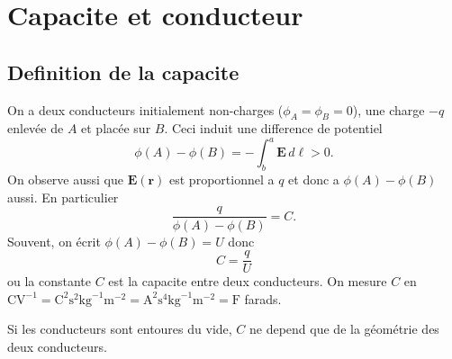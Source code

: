 \section{Capacite et conducteur}
\subsection{Definition de la capacite}

On a deux conducteurs initialement non-charges ($\phi _{A}=\phi _{B}=0$), une charge $-q$ enlevée de $A$ et placée sur $B$. Ceci induit une difference de potentiel
$$
\phi(A)-\phi(B)=-\int_{b}^{a} \boldsymbol{E} \, d\boldsymbol{\ell}>0.
$$
On observe aussi que $\boldsymbol{E}(\boldsymbol{r})$ est proportionnel a $q$ et donc a $\phi(A)-\phi(B)$ aussi. En particulier
$$
\frac{q}{\phi(A)-\phi(B)}=C.
$$
Souvent, on écrit $\phi(A)-\phi(B)=U$ donc 
$$
C=\frac{q}{U}
$$
ou la constante $C$ est la capacite entre deux conducteurs. On mesure $C$ en $\mathrm{CV}^{-1}=\mathrm{C}^{2}\mathrm{s}^{2}\mathrm{kg}^{-1}\mathrm{m}^{-2}=\mathrm{A}^{2}\mathrm{s}^{4}\mathrm{kg}^{-1}\mathrm{m}^{-2}=\mathrm{F}$ farads.

Si les conducteurs sont entoures du vide, $C$ ne depend que de la géométrie des deux conducteurs.

